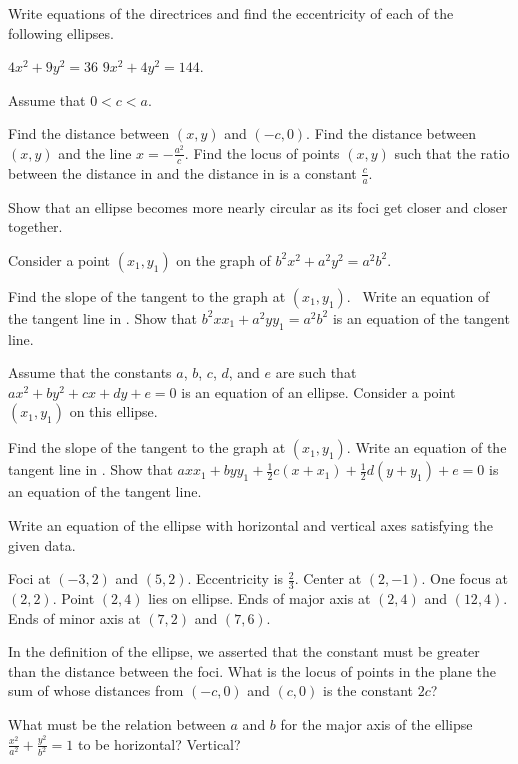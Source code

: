 \begin{exercises}
Write equations of the directrices and find the eccentricity
of each of the following ellipses.
\begin{exenum}
\sx
$4x^2 + 9y^2 = 36$
\sx
$9x^2 + 4y^2 = 144$.
\end{exenum}

Assume that $0 < c < a$.
\begin{exenum}
\sx
{}
Find the distance between $(x,y)$ and $(-c,0)$.
\sx
{}
Find the distance between $(x,y)$ and the line $x = -\frac{a^2}c$.
\sx
Find the locus of points $(x,y)$ such that the ratio between
the distance in  and the distance in 
is a constant $\frac ca$.
\end{exenum}

Show that an ellipse becomes more nearly circular
as its foci get closer and closer together.

Consider a point $(x_1,y_1)$ on the graph of
$b^2x^2 + a^2y^2 = a^2b^2$.
\begin{exenum}
\sx
{}
Find the slope of the tangent to the graph at $(x_1,y_1)$.\
\sx
Write an equation of the tangent line in .
\sx
Show that $b^2xx_1 + a^2yy_1 = a^2b^2$
is an equation of the tangent line.
\end{exenum}

Assume that the constants $a$, $b$, $c$, $d$, and $e$
are such that $ax^2 + by^2 + cx + dy + e = 0$
is an equation of an ellipse.
Consider a point $(x_1,y_1)$ on this ellipse.
\begin{exenum}
\sx
{}
Find the slope of the tangent to the graph at $(x_1,y_1)$.
\sx
Write an equation of the tangent line in .
\sx
Show that $axx_1 + byy_1 + \frac12c(x+x_1) +
\frac12d(y+y_1) + e = 0$ is an equation of the tangent line.
\end{exenum}

Write an equation of the ellipse with horizontal and vertical
axes satisfying the given data.
\begin{exenum}
\sx
Foci at $(-3,2)$ and $(5,2)$.  Eccentricity is $\frac23$.
\sx
Center at $(2,-1)$.  One focus at $(2,2)$.
Point $(2,4)$ lies on ellipse.
\sx
Ends of major axis at $(2,4)$ and $(12,4)$.
Ends of minor axis at $(7,2)$ and $(7,6)$.
\end{exenum}

In the definition of the ellipse, we asserted that the
constant must be greater than the distance between the foci.
What is the locus of points in the plane the sum of whose
distances from $(-c,0)$ and $(c,0)$ is the constant $2c$?

What must be the relation between $a$ and $b$ for the
major axis of the ellipse
$\frac{x^2}{a^2} + \frac{y^2}{b^2} = 1$
to be horizontal?  Vertical?

\end{exercises}
